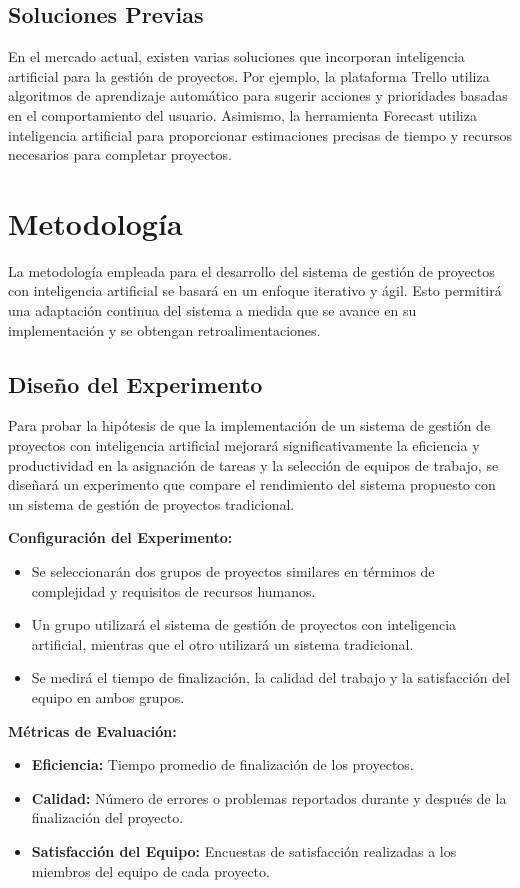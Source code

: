 \documentclass{article}
\begin{document}
    \subsection{Soluciones Previas}
    En el mercado actual, existen varias soluciones que incorporan inteligencia artificial para la gestión de proyectos. Por ejemplo, la plataforma Trello utiliza algoritmos de aprendizaje automático para sugerir acciones y prioridades basadas en el comportamiento del usuario. Asimismo, la herramienta Forecast utiliza inteligencia artificial para proporcionar estimaciones precisas de tiempo y recursos necesarios para completar proyectos.
    

\section{Metodología}
    La metodología empleada para el desarrollo del sistema de gestión de proyectos con inteligencia artificial se basará en un enfoque iterativo y ágil. Esto permitirá una adaptación continua del sistema a medida que se avance en su implementación y se obtengan retroalimentaciones.

    \subsection{Diseño del Experimento}
        Para probar la hipótesis de que la implementación de un sistema de gestión de proyectos con inteligencia artificial mejorará significativamente la eficiencia y productividad en la asignación de tareas y la selección de equipos de trabajo, se diseñará un experimento que compare el rendimiento del sistema propuesto con un sistema de gestión de proyectos tradicional.

        \textbf{Configuración del Experimento:}
        \begin{itemize}
            \item Se seleccionarán dos grupos de proyectos similares en términos de complejidad y requisitos de recursos humanos.
            \item Un grupo utilizará el sistema de gestión de proyectos con inteligencia artificial, mientras que el otro utilizará un sistema tradicional.
            \item Se medirá el tiempo de finalización, la calidad del trabajo y la satisfacción del equipo en ambos grupos.
        \end{itemize}

        \textbf{Métricas de Evaluación:}
        \begin{itemize}
            \item \textbf{Eficiencia:} Tiempo promedio de finalización de los proyectos.
            \item \textbf{Calidad:} Número de errores o problemas reportados durante y después de la finalización del proyecto.
            \item \textbf{Satisfacción del Equipo:} Encuestas de satisfacción realizadas a los miembros del equipo de cada proyecto.
        \end{itemize}
\end{document}
